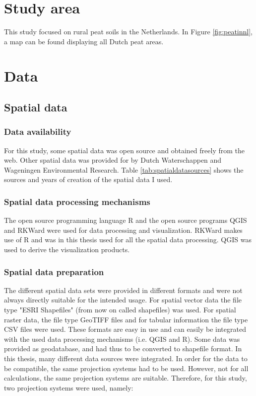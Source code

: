 {\section{Study area}

This study focused on rural peat soils in the Netherlands. In Figure \ref{fig:peatinnl}, a map can be found displaying all Dutch peat areas.

\section{Data}
\subsection{Spatial data}
\subsubsection{Data availability}
For this study, some spatial data was open source and obtained freely from the web. Other spatial data was provided for by Dutch Waterschappen and Wageningen Environmental Research. Table \ref{tab:spatialdatasources} shows the sources and years of creation of the spatial data I used. 

\subsubsection{Spatial data processing mechanisms}
The open source programming language R and the open source programs \ac{QGIS} and RKWard were used for data processing and visualization. RKWard makes use of R and was in this thesis used for all the spatial data processing. \ac{QGIS} was used to derive the visualization products.

\subsubsection{Spatial data preparation}
The different spatial data sets were provided in different formats and were not always directly suitable for the intended usage.
For spatial vector data the file type "ESRI Shapefiles" (from now on called shapefiles) was used. For spatial raster data, the file type \ac{GeoTIFF} files and for tabular information the file type \ac{CSV} files were used. These formats are easy in use and can easily be integrated with the used data processing mechanisms (i.e. \ac{QGIS} and R). Some data was provided as geodatabase, and had thus to be converted to shapefile format. In this thesis, many different data sources were integrated. In order for the data to be compatible, the same projection systems had to be used. However, not for all calculations, the same projection systems are suitable. Therefore, for this study, two projection systems were used, namely:

}
